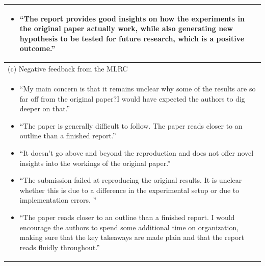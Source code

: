 \documentclass[letterpaper]{article}
\begin{document}
\begin{table}[htb]
\begin{tabular}{@{}l@{}}
\begin{minipage}[t]{\columnwidth}
\begin{itemize}[leftmargin=*]
\item ``The report provides good insights on how the experiments in the original paper actually work, while also generating new hypothesis to be tested for future research, which is a positive outcome.''
\end{itemize}
\end{minipage}
\\
\midrule
(c) Negative feedback from the MLRC \\
\midrule
\begin{minipage}[t]{\columnwidth}
\begin{itemize}[leftmargin=*]
\item ``My main concern is that it remains unclear why some of the results are so far off from the original paper?I would have expected the authors to dig deeper on that.''
\item ``The paper is generally difficult to follow. The paper reads closer to an outline than a finished report.''
\item ``It doesn't go above and beyond the reproduction and does not offer novel insights into the workings of the original paper.''
\item ``The submission failed at reproducing the original results. It is unclear whether this is due to a difference in the experimental setup or due to implementation errors. ''
\item ``The paper reads closer to an outline than a finished report. I would encourage the authors to spend some additional time on organization, making sure that the key takeaways are made plain and that the report reads fluidly throughout.''
\end{itemize}
\end{minipage}
\\
\bottomrule
\end{tabular}
\label{tab:feedback}
\end{table}
\fi
\end{document}
